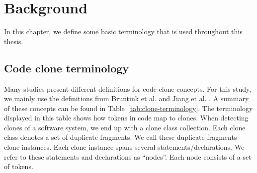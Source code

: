 \chapter{Background}
\label{ch:background}
In this chapter, we define some basic terminology that is used throughout this thesis.

\section{Code clone terminology}\label{sec:terminology}
Many studies present different definitions for code clone concepts. For this study, we mainly use the definitions from Bruntink et al. \cite{bruntink2005use} and Jiang et al. \cite{jiang2007deckard}. A summary of these concepts can be found in Table~\ref{tab:clone-terminology}. The terminology displayed in this table shows how tokens in code map to clones. When detecting clones of a software system, we end up with a clone class collection. Each clone class denotes a set of duplicate fragments. We call these duplicate fragments clone instances. Each clone instance spans several statements/declarations. We refer to these statements and declarations as ``nodes''. Each node consists of a set of tokens.

